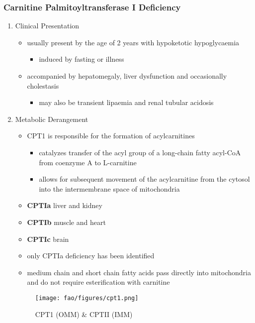 \documentclass[12pt]{scrartcl}
\begin{document}
\subsubsection{Carnitine Palmitoyltransferase I Deficiency}
\label{sec:orga348262}
\begin{enumerate}
\item Clinical Presentation
\label{sec:orgb4754d2}
\begin{itemize}
\item usually present by the age of 2 years with hypoketotic hypoglycaemia
\begin{itemize}
\item induced by fasting or illness
\end{itemize}
\item accompanied by hepatomegaly, liver dysfunction and occasionally cholestasis
\begin{itemize}
\item may also be transient lipaemia and renal tubular acidosis
\end{itemize}
\end{itemize}
\item Metabolic Derangement
\label{sec:org826cc18}
\begin{itemize}
\item CPT1 is responsible for the formation of acylcarnitines
\begin{itemize}
\item catalyzes transfer of the acyl group of a long-chain fatty
acyl-CoA from coenzyme A to L-carnitine
\item allows for subsequent movement of the acylcarnitine from the
cytosol into the intermembrane space of mitochondria
\end{itemize}
\item \textbf{CPTIa} liver and kidney
\item \textbf{CPTIb}  muscle and heart
\item \textbf{CPTIc}  brain
\item only CPTIa deficiency has been identified
\item medium chain and short chain fatty acids pass directly into
mitochondria and do not require esterification with carnitine
\end{itemize}

\begin{figure}[htbp]
\centering
\texttt{[image: fao/figures/cpt1.png]}
\caption{\label{fig:org6581d47}CPT1 (OMM) \& CPTII (IMM)}
\end{figure}


\end{enumerate}
\end{document}
